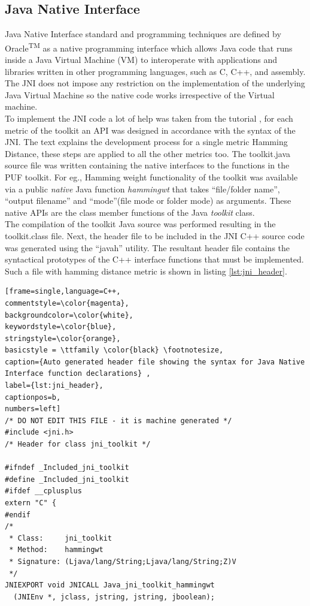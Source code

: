 \subsection{Java Native Interface}
Java Native Interface standard and programming techniques are defined by Oracle\textsuperscript{TM} as a native programming interface which allows Java code that runs inside a Java Virtual Machine (VM) to interoperate with applications and libraries written in other programming languages, such as C, C++, and assembly. The JNI does not impose any restriction on the implementation of the underlying Java Virtual Machine so the native code works irrespective of the Virtual machine.\\

To implement the JNI code a lot of help was taken from the tutorial \cite{jni_tutorial}, for each metric of the toolkit an API was designed in accordance with the syntax of the JNI. The text explains the development process for a single metric Hamming Distance, these steps are applied to all the other metrics too. The toolkit.java source file was written containing the native interfaces to the functions in the PUF toolkit. For eg., Hamming weight functionality of the toolkit was available via a
public \emph{native} Java function \emph{hammingwt} that takes ``file/folder name'', ``output filename'' and ``mode''(file mode or folder mode) as arguments.  These native APIs are the class member functions of the Java \emph{toolkit} class.\\

The compilation of the toolkit Java source was performed resulting in the toolkit.class file. Next, the header file to be included in the JNI C++ source code was generated using the ``javah'' utility. The resultant header file contains the syntactical prototypes of the C++ interface functions that must be implemented. Such a file with hamming distance metric is shown in listing \ref{lst:jni_header}.
\begin{lstlisting}[frame=single,language=C++,
commentstyle=\color{magenta},
backgroundcolor=\color{white},
keywordstyle=\color{blue},
stringstyle=\color{orange},
basicstyle = \ttfamily \color{black} \footnotesize,
caption={Auto generated header file showing the syntax for Java Native Interface function declarations} ,
label={lst:jni_header},
captionpos=b,
numbers=left]
/* DO NOT EDIT THIS FILE - it is machine generated */
#include <jni.h>
/* Header for class jni_toolkit */

#ifndef _Included_jni_toolkit
#define _Included_jni_toolkit
#ifdef __cplusplus
extern "C" {
#endif
/*
 * Class:     jni_toolkit
 * Method:    hammingwt
 * Signature: (Ljava/lang/String;Ljava/lang/String;Z)V
 */
JNIEXPORT void JNICALL Java_jni_toolkit_hammingwt
  (JNIEnv *, jclass, jstring, jstring, jboolean);
\end{lstlisting}

